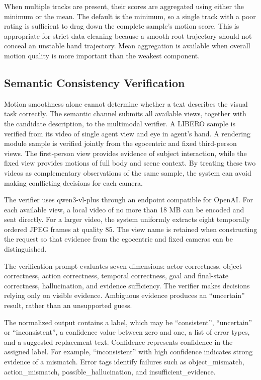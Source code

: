 \documentclass[11pt,oneside]{report}
\begin{document}
When multiple tracks are present, their scores are aggregated using either the minimum or the mean. The default is the minimum, so a single track with a poor rating is sufficient to drag down the complete sample's motion score. This is appropriate for strict data cleaning because a smooth root trajectory should not conceal an unstable hand trajectory. Mean aggregation is available when overall motion quality is more important than the weakest component.
\subsection{Semantic Consistency Verification}

Motion smoothness alone cannot determine whether a text describes the visual task correctly. The semantic channel submits all available views, together with the candidate description, to the multimodal verifier. A LIBERO sample is verified from its video of single agent view and eye in agent’s hand. A rendering module sample is verified jointly from the egocentric and fixed third-person views. The first-person view provides evidence of subject interaction, while the fixed view provides motions of full body and scene context. By treating these two videos as complementary observations of the same sample, the system can avoid making conflicting decisions for each camera.

The verifier uses qwen3-vl-plus through an endpoint compatible for OpenAI. For each available view, a local video of no more than 18 MB can be encoded and sent directly. For a larger video, the system uniformly extracts eight temporally ordered JPEG frames at quality 85. The view name is retained when constructing the request so that evidence from the egocentric and fixed cameras can be distinguished.

The verification prompt evaluates seven dimensions: actor correctness, object correctness, action correctness, temporal correctness, goal and final-state correctness, hallucination, and evidence sufficiency. The verifier makes decisions relying only on visible evidence. Ambiguous evidence produces an “uncertain” result, rather than an unsupported guess.

The normalized output contains a label, which may be “consistent”, “uncertain” or “inconsistent”, a confidence value between zero and one, a list of error types, and a suggested replacement text. Confidence represents confidence in the assigned label. For example, “inconsistent” with high confidence indicates strong evidence of a mismatch. Error tags identify failures such as object\_mismatch, action\_mismatch, possible\_hallucination, and insufficient\_evidence.
\end{document}
